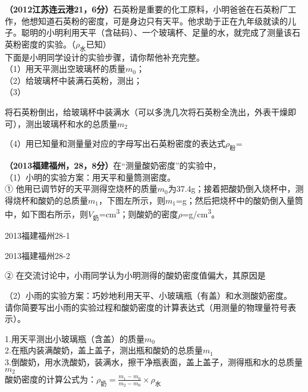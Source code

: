 \documentclass[12pt,twoside]{exam}
\begin{document}
\begin{knowledge}
\textbf{（2012江苏连云港21，6分）}石英粉是重要的化工原料，小明爸爸在石英粉厂工作，他想知道石英粉的密度，可是身边只有天平。他求助于正在九年级就读的儿子。聪明的小明利用天平（含砝码）、一个玻璃杯、足量的水，就完成了测量该石英粉密度的实验。（$\rho_\textrm{水}$已知）\\
下面是小明同学设计的实验步骤，请你帮他补充完整。\\
（1）用天平测出空玻璃杯的质量$m_0$；\\
（2）给玻璃杯中装满石英粉，测出；\\
（3）\begin{solutionorlines}[5em]
将石英粉倒出，给玻璃杯中装满水（可以多洗几次将石英粉全洗出，外表干燥即可），测出玻璃杯和水的总质量$m_2$
\end{solutionorlines}
（4）用已知量和测量量对应的字母写出石英粉密度的表达式$\rho_\textrm{粉}$=


\textbf{（2013福建福州，28，8分）}在“测量酸奶密度”的实验中，\\
（1）小明的实验方案：用天平和量筒测密度。\\
① 他用已调节好的天平测得空烧杯的质量$m_0$为37.4g；接着把酸奶倒入烧杯中，测得烧杯和酸奶的总质量$m_1$，下图左所示，则$m_1$=\answerline*[81.4]g；然后把烧杯中的酸奶倒入量筒中，如下图右所示，则$V_\textrm{奶}$=\answerline*[40]\si{cm^3}；则酸奶的密度$\rho$=\answerline*[1.1]\si{g/cm^3}。\\[20pt]
\noindent
\begin{minipage}{\textwidth}
\begin{minipage}[c][6cm][c]{0.82\textwidth}
\begin{linefig}{2013福建福州28-1}
\end{linefig}
\end{minipage}\hfill
\begin{minipage}[c][6cm][c]{0.18\textwidth}
\begin{linefig}{2013福建福州28-2}
\end{linefig}
\end{minipage} 
\end{minipage} 

\vspace{20pt}
② 在交流讨论中，小雨同学认为小明测得的酸奶密度值偏大，其原因是\\

（2）小雨的实验方案：巧妙地利用天平、小玻璃瓶（有盖）和水测酸奶密度。\\
请你简要写出小雨的实验过程和酸奶密度的计算表达式（用测量的物理量符号表示）。
\begin{solutionorbox}[6em]
1.用天平测出小玻璃瓶（含盖）的质量$m_0$\\
2.在瓶内装满酸奶，盖上盖子，测出瓶和酸奶的总质量$m_1$\\
3.倒酸奶，用水洗酸奶，装满水，擦干净瓶表面，盖上盖子，测得瓶和水的总质量$m_2$\\
酸奶密度的计算公式为：{\large $\rho_\textrm{奶}=\frac{m_1-m_0}{m_2-m_0} \times \rho_\textrm{水}$}
\end{solutionorbox}


\end{knowledge}
\end{document}
